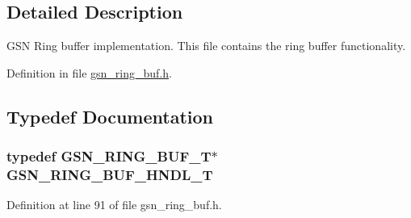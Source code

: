 \subsection{Detailed Description}
GSN Ring buffer implementation. This file contains the ring buffer functionality. 

Definition in file \hyperlink{a00578_source}{gsn\_\-ring\_\-buf.h}.



\subsection{Typedef Documentation}
\hypertarget{a00578_a33e5a462afbc26ddf2d6e33a4d0a80eb}{
\subsubsection[{GSN\_\-RING\_\-BUF\_\-HNDL\_\-T}]{\setlength{\rightskip}{0pt plus 5cm}typedef {\bf GSN\_\-RING\_\-BUF\_\-T}$\ast$ {\bf GSN\_\-RING\_\-BUF\_\-HNDL\_\-T}}}
\label{a00578_a33e5a462afbc26ddf2d6e33a4d0a80eb}


Definition at line 91 of file gsn\_\-ring\_\-buf.h.

